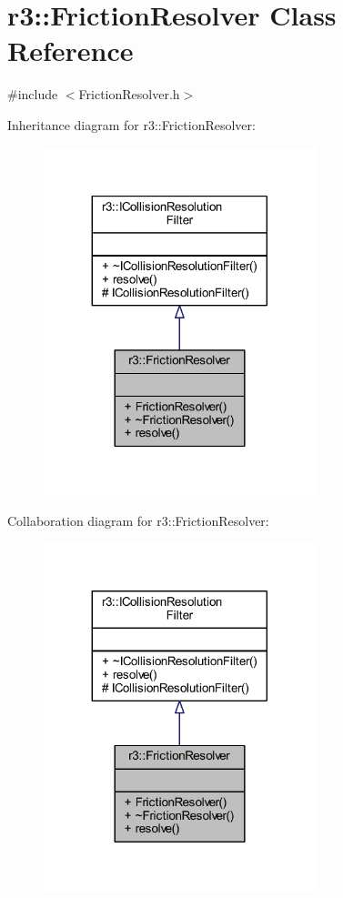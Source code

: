 \hypertarget{classr3_1_1_friction_resolver}{}\section{r3\+:\+:Friction\+Resolver Class Reference}
\label{classr3_1_1_friction_resolver}


{\ttfamily \#include $<$Friction\+Resolver.\+h$>$}



Inheritance diagram for r3\+:\+:Friction\+Resolver\+:\nopagebreak
\begin{figure}[H]
\begin{center}
\leavevmode
\includegraphics[width=224pt]{classr3_1_1_friction_resolver__inherit__graph}
\end{center}
\end{figure}


Collaboration diagram for r3\+:\+:Friction\+Resolver\+:\nopagebreak
\begin{figure}[H]
\begin{center}
\leavevmode
\includegraphics[width=224pt]{classr3_1_1_friction_resolver__coll__graph}
\end{center}
\end{figure}

